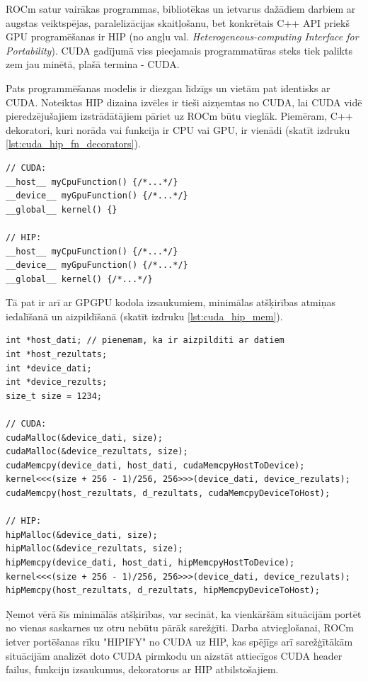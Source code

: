ROCm satur vairākas programmas, bibliotēkas un ietvarus dažādiem darbiem ar
augstas veiktspējas, paralelizācijas skaitļošanu, bet konkrētais C++ API priekš
GPU programēšanas ir HIP (no angļu val. \textit{Heterogeneous-computing
Interface for Portability}).\cite{HIP_docs} CUDA gadījumā viss pieejamais
programmatūras steks tiek palikts zem jau minētā, plašā termina - CUDA.

Pats programmēšanas modelis ir diezgan līdzīgs un vietām pat identisks ar
CUDA. Noteiktas HIP dizaina izvēles ir tieši aizņemtas no CUDA, lai CUDA vidē
pieredzējušajiem izstrādātājiem pāriet uz ROCm būtu vieglāk. Piemēram, C++
dekoratori, kuri norāda vai funkcija ir CPU vai GPU, ir vienādi (skatīt 
izdruku \ref{lst:cuda_hip_fn_decorators}).

\begin{lstlisting}[caption={CUDA un HIP funkciju definīciju salīdzinājums},
  label=lst:cuda_hip_fn_decorators,
  captionpos=t
]
// CUDA:
__host__ myCpuFunction() {/*...*/}
__device__ myGpuFunction() {/*...*/}
__global__ kernel() {}

// HIP:
__host__ myCpuFunction() {/*...*/}
__device__ myGpuFunction() {/*...*/}
__global__ kernel() {/*...*/}
\end{lstlisting}

Tā pat ir arī ar GPGPU kodola izsaukumiem, minimālas atšķirības atmiņas
iedalīšanā un aizpildīšanā (skatīt izdruku \ref{lst:cuda_hip_mem}).

\begin{lstlisting}[caption={CUDA un HIP kodola darbināšanas, atmiņas API
    izsaukumu salīdzinājums},
  label=lst:cuda_hip_mem,
  captionpos=t
]
int *host_dati; // pienemam, ka ir aizpilditi ar datiem
int *host_rezultats;
int *device_dati;
int *device_rezults;
size_t size = 1234;

// CUDA:
cudaMalloc(&device_dati, size);
cudaMalloc(&device_rezultats, size);
cudaMemcpy(device_dati, host_dati, cudaMemcpyHostToDevice);
kernel<<<(size + 256 - 1)/256, 256>>>(device_dati, device_rezulats);
cudaMemcpy(host_rezultats, d_rezultats, cudaMemcpyDeviceToHost);

// HIP:
hipMalloc(&device_dati, size);
hipMalloc(&device_rezultats, size);
hipMemcpy(device_dati, host_dati, hipMemcpyHostToDevice);
kernel<<<(size + 256 - 1)/256, 256>>>(device_dati, device_rezulats);
hipMemcpy(host_rezultats, d_rezultats, hipMemcpyDeviceToHost);
\end{lstlisting}

Ņemot vērā šīs minimālās atšķirības, var secināt, ka vienkāršām situācijām portēt no vienas saskarnes
uz otru nebūtu pārāk sarežģīti. Darba atvieglošanai, ROCm ietver portēšanas rīku "HIPIFY" 
\cite{HIPIFY_github} no CUDA uz HIP,
kas spējīgs arī sarežģītākām situācijām analizēt doto CUDA pirmkodu un aizstāt attiecīgos CUDA
header failus, funkciju izsaukumus, dekoratorus ar HIP atbilstošajiem.

